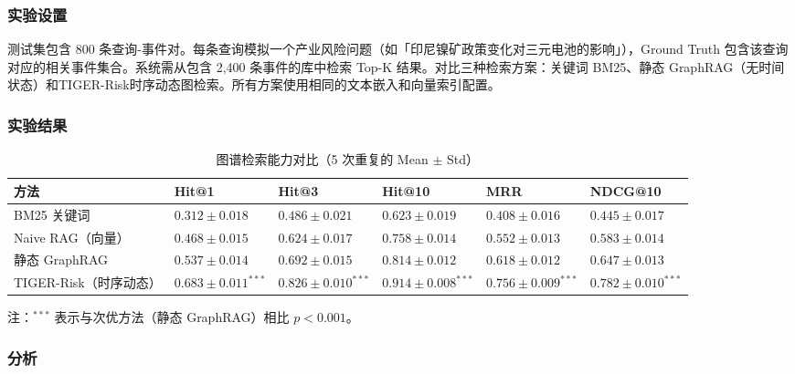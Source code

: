 \documentclass[12pt,a4paper]{article}
\newcommand{\projectshort}{TIGER-Risk}
\begin{document}
\subsubsection{实验设置}

测试集包含 800 条查询-事件对。每条查询模拟一个产业风险问题（如「印尼镍矿政策变化对三元电池的影响」），Ground Truth 包含该查询对应的相关事件集合。系统需从包含 2,400 条事件的库中检索 Top-K 结果。对比三种检索方案：关键词 BM25、静态 GraphRAG（无时间状态）和\projectshort 时序动态图检索。所有方案使用相同的文本嵌入和向量索引配置。

\subsubsection{实验结果}

\begin{table}[H]
\centering
\footnotesize
\caption{图谱检索能力对比（5 次重复的 Mean $\pm$ Std）}
\label{tab:exp-retrieval}
\begin{tabularx}{0.95\linewidth}{>{\raggedright\arraybackslash}p{2.4cm} >{\centering\arraybackslash}X >{\centering\arraybackslash}X >{\centering\arraybackslash}X >{\centering\arraybackslash}X >{\centering\arraybackslash}X}
\toprule
\textbf{方法} & \textbf{Hit@1} & \textbf{Hit@3} & \textbf{Hit@10} & \textbf{MRR} & \textbf{NDCG@10} \\
\midrule
BM25 关键词 & $0.312 \pm 0.018$ & $0.486 \pm 0.021$ & $0.623 \pm 0.019$ & $0.408 \pm 0.016$ & $0.445 \pm 0.017$ \\
Naive RAG（向量） & $0.468 \pm 0.015$ & $0.624 \pm 0.017$ & $0.758 \pm 0.014$ & $0.552 \pm 0.013$ & $0.583 \pm 0.014$ \\
静态 GraphRAG & $0.537 \pm 0.014$ & $0.692 \pm 0.015$ & $0.814 \pm 0.012$ & $0.618 \pm 0.012$ & $0.647 \pm 0.013$ \\
\projectshort（时序动态） & $\mathbf{0.683 \pm 0.011}^{***}$ & $\mathbf{0.826 \pm 0.010}^{***}$ & $\mathbf{0.914 \pm 0.008}^{***}$ & $\mathbf{0.756 \pm 0.009}^{***}$ & $\mathbf{0.782 \pm 0.010}^{***}$ \\
\bottomrule
\end{tabularx}
\end{table}

注：$^{***}$ 表示与次优方法（静态 GraphRAG）相比 $p < 0.001$。

\subsubsection{分析}
\end{document}
